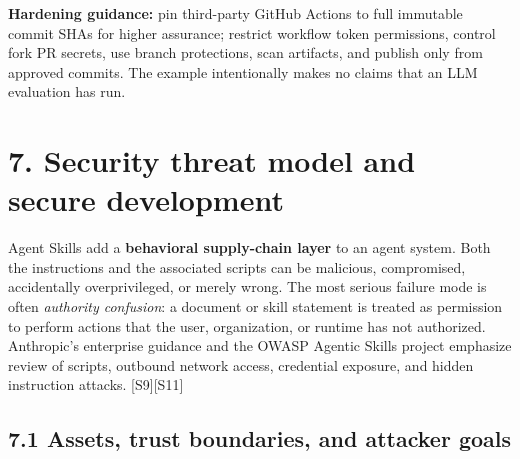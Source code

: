 \documentclass[
  10pt,
  letterpaper,
]{article}
\begin{document}
\textbf{Hardening guidance:} pin third-party GitHub Actions to full
immutable commit SHAs for higher assurance; restrict workflow token
permissions, control fork PR secrets, use branch protections, scan
artifacts, and publish only from approved commits. The example
intentionally makes no claims that an LLM evaluation has run.

\section{7. Security threat model and secure
development}\label{security-threat-model-and-secure-development}

Agent Skills add a \textbf{behavioral supply-chain layer} to an agent
system. Both the instructions and the associated scripts can be
malicious, compromised, accidentally overprivileged, or merely wrong.
The most serious failure mode is often \emph{authority confusion}: a
document or skill statement is treated as permission to perform actions
that the user, organization, or runtime has not authorized. Anthropic's
enterprise guidance and the OWASP Agentic Skills project emphasize
review of scripts, outbound network access, credential exposure, and
hidden instruction attacks. {[}S9{]}{[}S11{]}

\subsection{7.1 Assets, trust boundaries, and attacker
goals}\label{assets-trust-boundaries-and-attacker-goals}
\end{document}
